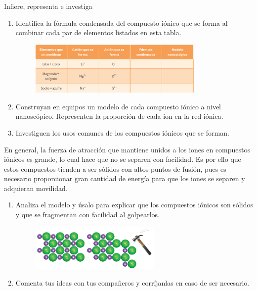 \documentclass[11pt]{book}
\begin{document}
\begin{boxK}
  Infiere, representa e investiga
  \begin{enumerate}
    \item Identifica la fórmula condensada del compuesto iónico que se forma al combinar cada par
          de elementos listados en esta tabla.
          \begin{figure}[H]
            \centering
            \includegraphics[width=0.8\textwidth]{tabla_ionicos.png}
            \label{fig:tabla_ionicos}
          \end{figure}
    \item Construyan en equipos un modelo de cada compuesto iónico a nivel nanoscópico. Representen la proporción de cada ion en la red iónica.
    \item Investiguen los usos comunes de los compuestos iónicos que se forman.
  \end{enumerate}
\end{boxK}

En general, la fuerza de atracción que mantiene unidos a los iones en compuestos iónicos es grande,
lo cual hace que no se separen con facilidad. Es por ello que estos compuestos tienden a ser sólidos
con altos puntos de fusión, pues es necesario proporcionar gran cantidad de energía para que los
iones se separen y adquieran movilidad.

\begin{boxK}
  \begin{enumerate}
    \item  Analiza el modelo y úsalo para explicar que los compuestos iónicos son sólidos y que se fragmentan con facilidad al golpearlos.
          \begin{figure}[H]
            \centering
            \includegraphics[width=0.6\textwidth]{ionicos3.png}
            \label{fig:ionicos3}
          \end{figure}
    \item Comenta tus ideas con tus compañeros y corríjanlas en caso de ser necesario.
  \end{enumerate}
\end{boxK}
\end{document}
